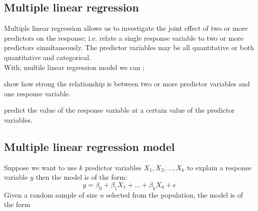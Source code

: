 \documentclass[11pt]{article}\usepackage[]{graphicx}\usepackage[]{xcolor}
\numberwithin{equation}{section}
\numberwithin{table}{section}
\begin{document}
\subsection{Multiple linear regression}
Multiple linear regression allows us to investigate the joint effect of two or more  predictors on the response; i.e. relate a single response variable to two or more  predictors simultaneously. The predictor variables may be all quantitative or both quantitative and categorical.\\
With, multile linear regression model we can  ;

\begin{bracketedromanenum}
	\item show how strong the relationship is between two or more predictor variables and one response variable.
	\item predict the value of the response variable at a certain value of the predictor variables.
\end{bracketedromanenum}

\subsection{Multiple linear regression model}

Suppose we want to use $k$ predictor variables $X_1, X_2, \ldots, X_k$ to explain a response variable $y$ then the model is of the form:
\begin{equation}
	y=\beta_0+\beta_1 X_1+\ldots+\beta_k X_k+\epsilon
	\label{eq:methodology_eq1}
\end{equation}
Given a random sample of size $n$ selected from the population, the model is of the form
\end{document}
